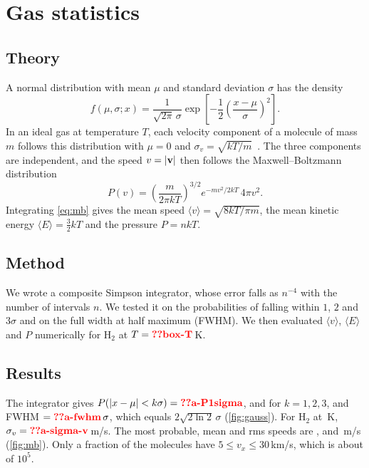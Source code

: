 \documentclass[aps,prd,twocolumn,nofootinbib,floatfix,superscriptaddress]{revtex4-2}
\begin{document}
\section{Gas statistics}\label{sec:stat}
\subsection{Theory}
A normal distribution with mean $\mu$ and standard deviation $\sigma$ has the density
\begin{equation}
  f(\mu,\sigma;x) = \frac{1}{\sqrt{2\pi}\,\sigma}\exp\left[-\frac{1}{2}\left(\frac{x-\mu}{\sigma}\right)^2\right].
\end{equation}
In an ideal gas at temperature $T$, each velocity component of a molecule of mass $m$ follows this distribution with $\mu=0$ and $\sigma_v=\sqrt{kT/m}$~\cite{schroeder2000}.
The three components are independent, and the speed $v=|\mathbf{v}|$ then follows the Maxwell--Boltzmann distribution
\begin{equation}
  P(v) = \left(\frac{m}{2\pi kT}\right)^{3/2} e^{-mv^2/2kT}\,4\pi v^2. \label{eq:mb}
\end{equation}
Integrating \cref{eq:mb} gives the mean speed $\langle v\rangle=\sqrt{8kT/\pi m}$, the mean kinetic energy $\langle E\rangle=\tfrac32 kT$ and the pressure $P=nkT$.

\subsection{Method}
We wrote a composite Simpson integrator, whose error falls as $n^{-4}$ with the number of intervals $n$.
We tested it on the probabilities of falling within $1$, $2$ and $3\sigma$ and on the full width at half maximum (FWHM).
We then evaluated $\langle v\rangle$, $\langle E\rangle$ and $P$ numerically for H$_2$ at $T=\val{box-T}\,$K.

\subsection{Results}
The integrator gives $P(|x-\mu|<k\sigma)=\val{a-P1sigma}$,  and  for $k=1,2,3$, and FWHM $=\val{a-fwhm}\,\sigma$, which equals $2\sqrt{2\ln2}\,\sigma$ (\cref{fig:gauss}).
For H$_2$ at \,K, $\sigma_v=\val{a-sigma-v}$\,m/s.
The most probable, mean and rms speeds are ,  and \,m/s (\cref{fig:mb}).
Only a fraction  of the molecules have $5\le v_x\le30$\,km/s, which is about  of $10^5$.
\end{document}
